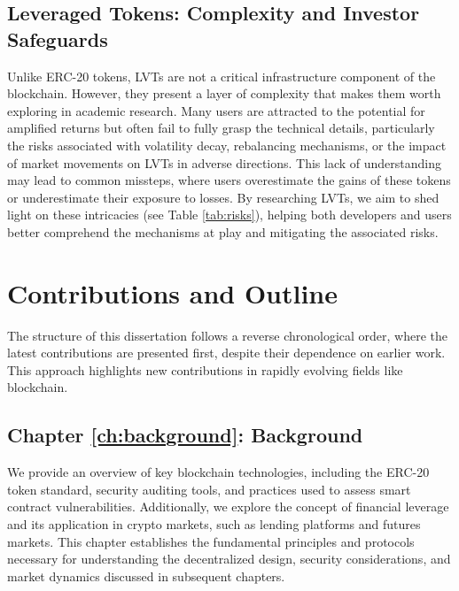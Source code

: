 \subsection*{Leveraged Tokens: Complexity and Investor Safeguards}
Unlike ERC-20 tokens, LVTs are not a critical infrastructure component of the blockchain. However, they present a layer of complexity that makes them worth exploring in academic research. Many users are attracted to the potential for amplified returns but often fail to fully grasp the technical details, particularly the risks associated with volatility decay, rebalancing mechanisms, or the impact of market movements on LVTs in adverse directions. This lack of understanding may lead to common missteps, where users overestimate the gains of these tokens or underestimate their exposure to losses. By researching LVTs, we aim to shed light on these intricacies (see Table \ref{tab:risks}), helping both developers and users better comprehend the mechanisms at play and mitigating the associated risks.


\section{Contributions and Outline} 
The structure of this dissertation follows a reverse chronological order, where the latest contributions are presented first, despite their dependence on earlier work. This approach highlights new contributions in rapidly evolving fields like blockchain.

\subsection*{Chapter \ref{ch:background}: Background} We provide an overview of key blockchain technologies, including the ERC-20 token standard, security auditing tools, and practices used to assess smart contract vulnerabilities. Additionally, we explore the concept of financial leverage and its application in crypto markets, such as lending platforms and futures markets. This chapter establishes the fundamental principles and protocols necessary for understanding the decentralized design, security considerations, and market dynamics discussed in subsequent chapters.

